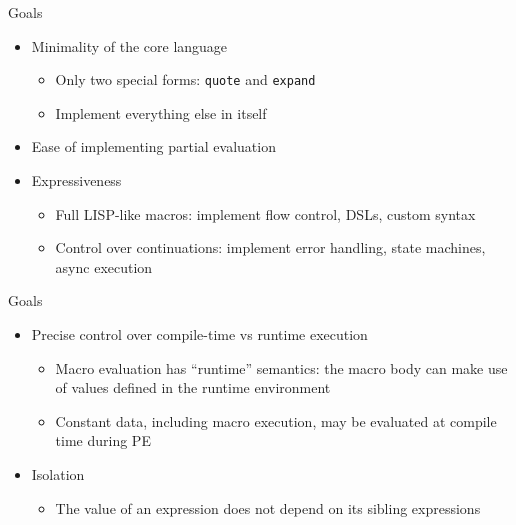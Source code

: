 

\begin{frame}
\maketitle
\end{frame}

\begin{frame}[fragile]{Goals}
\begin{itemize}
    \item Minimality of the core language
        \begin{itemize}
            \item Only two special forms: \verb|quote| and \verb|expand|
            \item Implement everything else in \lang itself
        \end{itemize}
    \item Ease of implementing partial evaluation
    \item Expressiveness
        \begin{itemize}
            \item Full LISP-like macros: implement flow control, DSLs, custom syntax
            \item Control over continuations: implement error handling, state machines, async execution
        \end{itemize}
\end{itemize}
\end{frame}
\begin{frame}[fragile]{Goals}
\begin{itemize}
    \item Precise control over compile-time vs runtime execution
        \begin{itemize}
            \item Macro evaluation has ``runtime'' semantics: the macro body can make use of values defined in the runtime environment
            \item Constant data, including macro execution, may be evaluated at compile time during PE
        \end{itemize}
    \item Isolation
        \begin{itemize}
            \item The value of an expression does not depend on its sibling expressions
        \end{itemize}
\end{itemize}
\end{frame}

